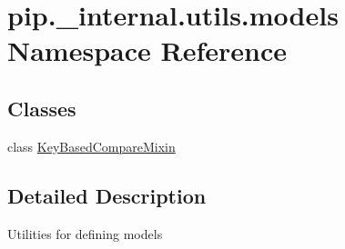 \hypertarget{namespacepip_1_1__internal_1_1utils_1_1models}{}\section{pip.\+\_\+internal.\+utils.\+models Namespace Reference}
\label{namespacepip_1_1__internal_1_1utils_1_1models}
\subsection*{Classes}
\begin{DoxyCompactItemize}
\item 
class \hyperlink{classpip_1_1__internal_1_1utils_1_1models_1_1KeyBasedCompareMixin}{Key\+Based\+Compare\+Mixin}
\end{DoxyCompactItemize}


\subsection{Detailed Description}
\begin{DoxyVerb}Utilities for defining models
\end{DoxyVerb}
 